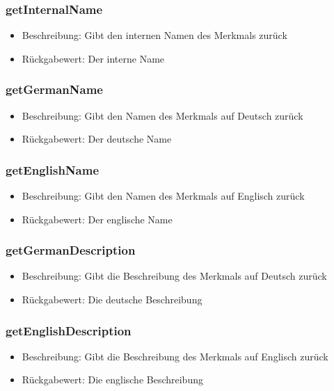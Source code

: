 \documentclass[a4paper]{scrreprt}
\begin{document}
    \subsubsection{getInternalName}
    \begin{itemize}
        \item Beschreibung: Gibt den internen Namen des Merkmals zurück
        \item Rückgabewert: Der interne Name
    \end{itemize}
    \subsubsection{getGermanName}
    \begin{itemize}
        \item Beschreibung: Gibt den Namen des Merkmals auf Deutsch zurück
        \item Rückgabewert: Der deutsche Name
    \end{itemize}
    \subsubsection{getEnglishName}
    \begin{itemize}
        \item Beschreibung: Gibt den Namen des Merkmals auf Englisch zurück
        \item Rückgabewert: Der englische Name
    \end{itemize}
    \subsubsection{getGermanDescription}
    \begin{itemize}
        \item Beschreibung: Gibt die Beschreibung des Merkmals auf Deutsch zurück
        \item Rückgabewert: Die deutsche Beschreibung
    \end{itemize}
    \subsubsection{getEnglishDescription}
    \begin{itemize}
        \item Beschreibung: Gibt die Beschreibung des Merkmals auf Englisch zurück
        \item Rückgabewert: Die englische Beschreibung
    \end{itemize}
\end{document}
